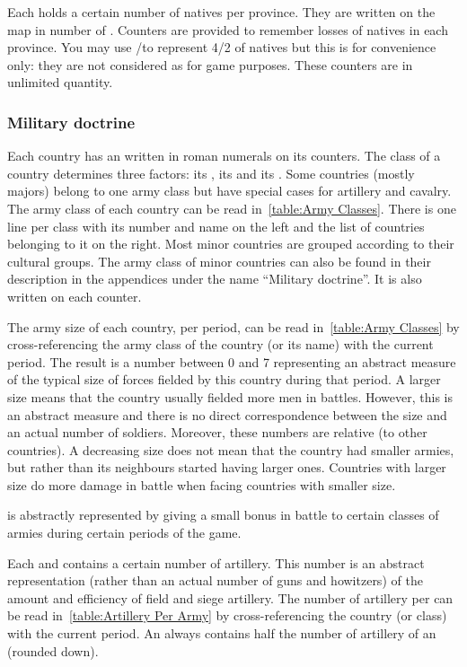\aparag[Natives.] Each \ROTW \Area holds a certain number of natives per
province. They are written on the \ROTW map in number of \LD.
\bparag Counters are provided to remember losses of natives in each
province. You may use \ARMY\faceplus/\facemoins to represent 4/2 \LD of
natives but this is for convenience only: they are not considered as \ARMY for
game purposes. These counters are in unlimited quantity.


\subsubsection{Military doctrine}
\aparag Each country has an  written in roman numerals on
its counters.
\bparag The class of a country determines three factors: its , its
 and its .
\bparag Some countries (mostly majors) belong to one army class but have
special cases for artillery and cavalry.
\bparag The army class of each country can be read in~\ref{table:Army
  Classes}. There is one line per class with its number and name on the left
and the list of countries belonging to it on the right.
\bparag Most minor countries are grouped according to their cultural groups.
\bparag The army class of minor countries can also be found in their
description in the appendices under the name ``Military doctrine''. It is also
written on each counter.


\aparag[Size.] The army size of each country, per period, can be read
in~\ref{table:Army Classes} by cross-referencing the army class of the country
(or its name) with the current period.
\bparag The result is a number between 0 and 7 representing an abstract
measure of the typical size of forces fielded by this country during that
period.
\bparag A larger size means that the country usually fielded more men in
battles. However, this is an abstract measure and there is no direct
correspondence between the size and an actual number of soldiers. Moreover,
these numbers are relative (to other countries). A decreasing size does not
mean that the country had smaller armies, but rather than its neighbours
started having larger ones.
\bparag Countries with larger size do more damage in battle when facing
countries with smaller size.

\aparag[Cavalry] is abstractly represented by giving a small bonus in battle
to certain classes of armies during certain periods of the game.

\aparag[Artillery.] Each \ARMY\facemoins and \ARMY\faceplus contains a certain
number of artillery. This number is an abstract representation (rather than an
actual number of guns and howitzers) of the amount and efficiency of field and
siege artillery.
\bparag The number of artillery per \ARMY\faceplus can be read
in~\ref{table:Artillery Per Army} by cross-referencing the country (or class)
with the current period.
\bparag An \ARMY\facemoins always contains half the number of artillery of an
\ARMY\faceplus (rounded down).

